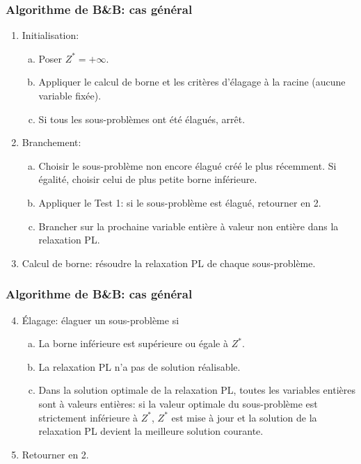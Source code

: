\documentclass[usepdftitle=false, aspectratio=169]{beamer}
\begin{document}
\begin{frame}
\frametitle{Algorithme de B\&B: cas général}

\begin{enumerate}
\item
Initialisation:
\begin{enumerate}[(a)]
\item
Poser $Z^* = +\infty$.
\item
Appliquer le calcul de borne et les critères d'élagage à la racine (aucune variable fixée).
\item
Si tous les sous-problèmes ont été élagués, arrêt.
\end{enumerate}
\item
Branchement:
\begin{enumerate}[(a)]
\item
Choisir le sous-problème non encore élagué créé le plus récemment. Si égalité, choisir celui de plus petite borne inférieure.
\item
Appliquer le Test 1: si le sous-problème est élagué, retourner en 2.
\item
Brancher sur la prochaine variable entière à valeur non entière dans la relaxation PL.
\end{enumerate}
\item
Calcul de borne: résoudre la relaxation PL de chaque sous-problème.
\end{enumerate}

\end{frame}

\begin{frame}
\frametitle{Algorithme de B\&B: cas général}

\begin{enumerate}
\setcounter{enumi}{3}
\item
Élagage: élaguer un sous-problème si
\begin{enumerate}[(a)]
\item
La borne inférieure est supérieure ou égale à $Z^*$.
\item
La relaxation PL n'a pas de solution réalisable.
\item
Dans la solution optimale de la relaxation PL, toutes les variables entières sont à valeurs entières: si la valeur optimale du sous-problème est strictement inférieure à $Z^*$, $Z^*$ est mise à jour et la solution de la relaxation PL devient la meilleure solution courante.
\end{enumerate}
\item
Retourner en 2.
\end{enumerate}

\end{frame}
\end{document}
